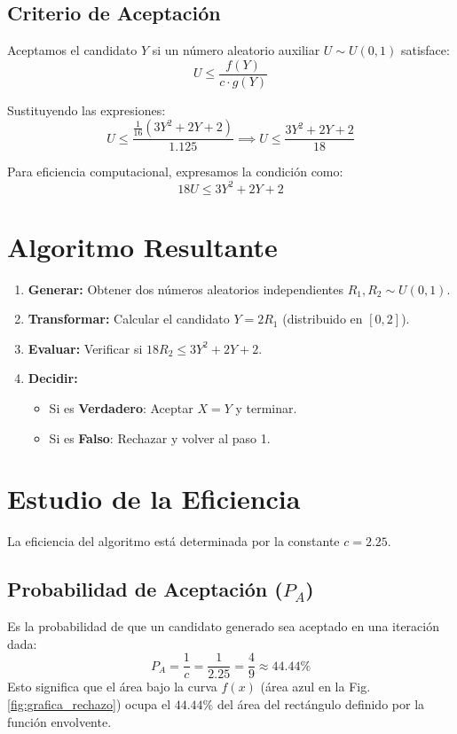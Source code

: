 \documentclass[12pt, a4paper]{article}
\begin{document}
	\subsection{Criterio de Aceptación}
	
	Aceptamos el candidato $Y$ si un número aleatorio auxiliar $U \sim U(0,1)$ satisface:
	\[ U \leq \frac{f(Y)}{c \cdot g(Y)} \]
	
	Sustituyendo las expresiones:
	\begin{equation}
		U \leq \frac{\frac{1}{16}(3Y^2 + 2Y + 2)}{1.125} \implies U \leq \frac{3Y^2 + 2Y + 2}{18}
	\end{equation}
	
	Para eficiencia computacional, expresamos la condición como:
	\[ 18U \leq 3Y^2 + 2Y + 2 \]
	
	\section{Algoritmo Resultante}
	
	\begin{enumerate}
		\item \textbf{Generar:} Obtener dos números aleatorios independientes $R_1, R_2 \sim U(0, 1)$.
		\item \textbf{Transformar:} Calcular el candidato $Y = 2 R_1$ (distribuido en $[0, 2]$).
		\item \textbf{Evaluar:} Verificar si $18 R_2 \leq 3Y^2 + 2Y + 2$.
		\item \textbf{Decidir:}
		\begin{itemize}
			\item Si es \textbf{Verdadero}: Aceptar $X = Y$ y terminar.
			\item Si es \textbf{Falso}: Rechazar y volver al paso 1.
		\end{itemize}
	\end{enumerate}
	
	\section{Estudio de la Eficiencia}
	
	La eficiencia del algoritmo está determinada por la constante $c = 2.25$.
	
	\subsection{Probabilidad de Aceptación ($P_A$)}
	Es la probabilidad de que un candidato generado sea aceptado en una iteración dada:
	\begin{equation}
		P_A = \frac{1}{c} = \frac{1}{2.25} = \frac{4}{9} \approx 44.44\%
	\end{equation}
	Esto significa que el área bajo la curva $f(x)$ (área azul en la Fig. \ref{fig:grafica_rechazo}) ocupa el $44.44\%$ del área del rectángulo definido por la función envolvente.
	
\end{document}
